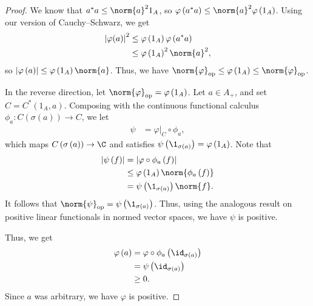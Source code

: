 \documentclass[10pt]{mypackage}
\DeclareMathOperator{\op}{op}
\begin{document}
\begin{proof}
  We know that $a^{\ast}a\leq \norm{a}^21_A$, so $\varphi\left(a^{\ast}a\right)\leq \norm{a}^2\varphi\left(1_A\right)$. Using our version of Cauchy--Schwarz, we get
  \begin{align*}
    \left\vert \varphi(a) \right\vert^2 &\leq \varphi\left(1_A\right)\varphi\left(a^{\ast}a\right)\\
                                        &\leq \varphi\left(1_A\right)^2\norm{a}^2,
  \end{align*}
  so $\left\vert \varphi\left(a\right) \right\vert\leq \varphi\left(1_A\right)\norm{a}$. Thus, we have $\norm{\varphi}_{\op}\leq \varphi\left(1_A\right)\leq \norm{\varphi}_{\op}$.\newline

  In the reverse direction, let $\norm{\varphi}_{\op} = \varphi\left(1_A\right)$. Let $a\in A_{+}$, and set $C = C^{\ast}\left(1_A,a\right)$. Composing with the continuous functional calculus $\phi_a\colon C\left(\sigma\left(a\right)\right)\rightarrow C$, we let
  \begin{align*}
    \psi &= \varphi|_{C}\circ \phi_a,
  \end{align*}
  which maps $C\left(\sigma\left(a\right)\right)\rightarrow \C$ and satisfies $\psi\left(\1_{\sigma\left(a\right)}\right) = \varphi\left(1_A\right)$. Note that
  \begin{align*}
    \left\vert \psi\left(f\right) \right\vert &= \left\vert \varphi\circ \phi_a\left(f\right) \right\vert\\
                                              &\leq \varphi\left(1_A\right)\norm{\phi_a\left(f\right)}\\
                                              &= \psi\left(\1_{\sigma\left(a\right)}\right)\norm{f}.
  \end{align*}
  It follows that $\norm{\psi}_{\op} = \psi\left(\1_{\sigma\left(a\right)}\right)$. Thus, using the analogous result on positive linear functionals in normed vector spaces, we have $\psi$ is positive.\newline

  Thus, we get
  \begin{align*}
    \varphi\left(a\right) &= \varphi\circ \phi_a\left(\id_{\sigma\left(a\right)}\right)\\
                          &= \psi\left(\id_{\sigma\left(a\right)}\right)\\
                          &\geq 0.
  \end{align*}
  Since $a$ was arbitrary, we have $\varphi$ is positive.
\end{proof}
\end{document}
